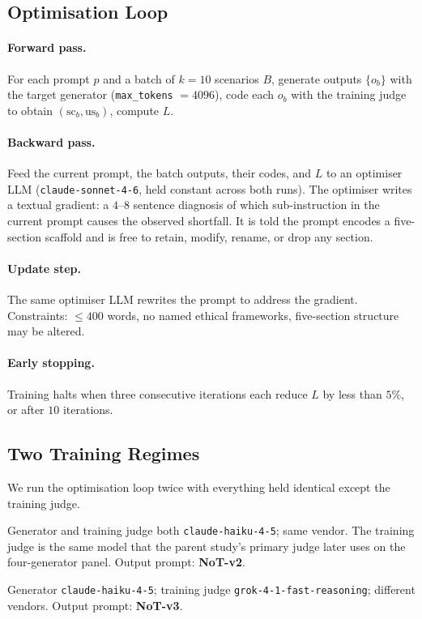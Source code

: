 \documentclass[11pt]{article}
\begin{document}
\subsection{Optimisation Loop}

\paragraph{Forward pass.}
For each prompt $p$ and a batch of $k = 10$ scenarios $B$, generate outputs $\{o_b\}$ with the target generator (\texttt{max\_tokens} $= 4096$), code each $o_b$ with the training judge to obtain $(\text{sc}_b, \text{us}_b)$, compute $L$.

\paragraph{Backward pass.}
Feed the current prompt, the batch outputs, their codes, and $L$ to an optimiser LLM (\texttt{claude-sonnet-4-6}, held constant across both runs).
The optimiser writes a textual gradient: a $4$--$8$ sentence diagnosis of which sub-instruction in the current prompt causes the observed shortfall.
It is told the prompt encodes a five-section scaffold and is free to retain, modify, rename, or drop any section.

\paragraph{Update step.}
The same optimiser LLM rewrites the prompt to address the gradient.
Constraints: $\leq 400$ words, no named ethical frameworks, five-section structure may be altered.

\paragraph{Early stopping.}
Training halts when three consecutive iterations each reduce $L$ by less than $5\%$, or after $10$ iterations.

\subsection{Two Training Regimes}

We run the optimisation loop twice with everything held identical except the training judge.

\begin{description}\setlength{\itemsep}{2pt}
\item[Run A (in-family).] Generator and training judge both \texttt{claude-haiku-4-5}; same vendor.
The training judge is the same model that the parent study's primary judge later uses on the four-generator panel.
Output prompt: \textbf{NoT-v2}.
\item[Run B (cross-family).] Generator \texttt{claude-haiku-4-5}; training judge \texttt{grok-4-1-fast-reasoning}; different vendors.
Output prompt: \textbf{NoT-v3}.
\end{description}
\end{document}
